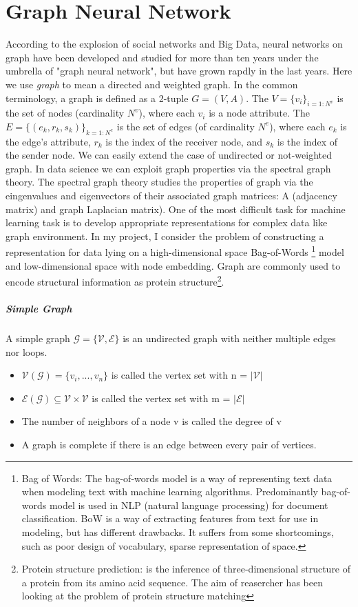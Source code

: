 \documentclass{report}
\begin{document}
\section{Graph Neural Network}
According to the explosion of social networks and Big Data, neural networks on graph have been developed and studied  for more than ten years under the umbrella of "graph neural network", but have grown rapdly in the last years.
Here we use \textit{graph} to mean a directed and weighted graph. In the common terminology, a graph is defined as a 2-tuple $G = ( V, A)$. The $V = \{v_i\}_{i=1:N^v}$ is the set of nodes (cardinality $N^v$), where each $v_i$ is a node attribute. The $E = \{(e_k,r_k,s_k)\}_{k=1:N^e}$ is the set of edges (of cardinality $N^e$), where each $e_k$ is the edge's attribute, $r_k$ is the index of the receiver node, and $s_k$ is the index of the sender node. We can easily extend the case of undirected or not-weighted graph.
In data science we can exploit graph properties via the spectral graph theory. The spectral graph theory studies the properties of graph via the eingenvalues and eigenvectors of their associated graph matrices: A (adjacency matrix) and graph Laplacian matrix).
One of the most difficult task for machine learning task is to develop appropriate representations for complex data like graph environment. 
In my project, I consider the problem of constructing a representation for data lying on a high-dimensional space Bag-of-Words \footnote{Bag of Words: The bag-of-words model is a way of representing text data when modeling text with machine learning algorithms. Predominantly bag-of-words model is used in NLP (natural language processing) for document classification. BoW is a way of extracting features from text for use in modeling, but has different drawbacks. It suffers from some shortcomings, such as poor design of vocabulary, sparse representation of space.} model and low-dimensional space with node embedding. Graph are commonly used to encode structural information as protein structure\footnote{Protein structure prediction: is the inference of three-dimensional structure of a protein from its amino acid sequence. The aim of reasercher has been looking at the problem of protein structure matching}.
\subparagraph{Simple Graph}
A simple graph $\mathcal{G}=\{\mathcal{V}, \mathcal{E}\}$ is an undirected graph with neither multiple edges nor loops.
\begin{itemize}
\item $\mathcal{V}(\mathcal{G})= \{v_i,...,v_n\}$ is called the vertex set with n = $|\mathcal{V}|$
\item $\mathcal{E}(\mathcal{G})\subseteq \mathcal{V} \times \mathcal{V}$ is called the vertex set with m = $|\mathcal{E}|$
\item The number of neighbors of a node v is called the degree of v
\item A graph is complete if there is an edge between every pair of
vertices.
\end{itemize}
\end{document}
